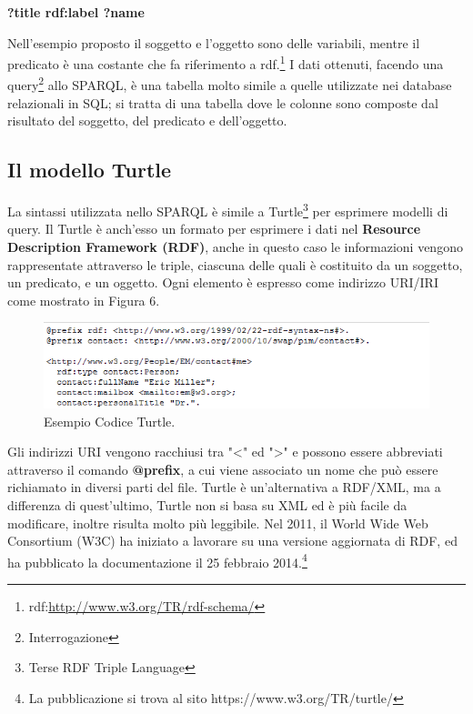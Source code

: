 \documentclass[a4paper,11pt]{article}
\begin{document}
\begin{center}	
	\textbf{?title rdf:label ?name}
\end{center}

Nell'esempio proposto il soggetto e l'oggetto sono delle variabili, mentre il predicato è una costante che fa riferimento a rdf.\footnote{rdf:\url{http://www.w3.org/TR/rdf-schema/}}\newline
I dati ottenuti, facendo una query\footnote{Interrogazione} allo SPARQL, è una tabella molto simile a quelle utilizzate nei database relazionali in SQL; si tratta di una tabella dove le colonne sono composte dal risultato del soggetto, del predicato e dell'oggetto. 

\subsection{Il modello Turtle}
\label{sec:4.1}
La sintassi utilizzata nello SPARQL è simile a Turtle\footnote{Terse RDF Triple Language} per esprimere modelli di query. \newline 
Il Turtle è anch'esso un formato per esprimere i dati nel \textbf{Resource Description Framework (RDF)},  anche in questo caso le informazioni vengono rappresentate attraverso le triple, ciascuna delle quali è costituito da un soggetto, un predicato, e un oggetto. Ogni elemento è espresso come indirizzo URI/IRI come mostrato in Figura 6.
\begin{figure}[htbp]
	\centering
	\includegraphics[scale=1]{turtle.png}
	\caption{Esempio Codice Turtle.}
	\label{fig:8}
\end{figure}
Gli indirizzi URI vengono racchiusi tra "<" ed ">" e possono essere abbreviati attraverso il comando \textbf{@prefix}, a cui viene associato un nome che può essere richiamato in diversi parti del file.\newline
Turtle è un'alternativa a RDF/XML, ma a differenza di quest'ultimo, Turtle non si basa su XML ed è più facile da modificare, inoltre risulta molto più leggibile.\newline
Nel 2011, il World Wide Web Consortium (W3C) ha iniziato a lavorare su una versione aggiornata di RDF, ed ha pubblicato la documentazione il 25 febbraio 2014.\footnote{La pubblicazione si trova al sito https://www.w3.org/TR/turtle/}
\newpage
\end{document}
